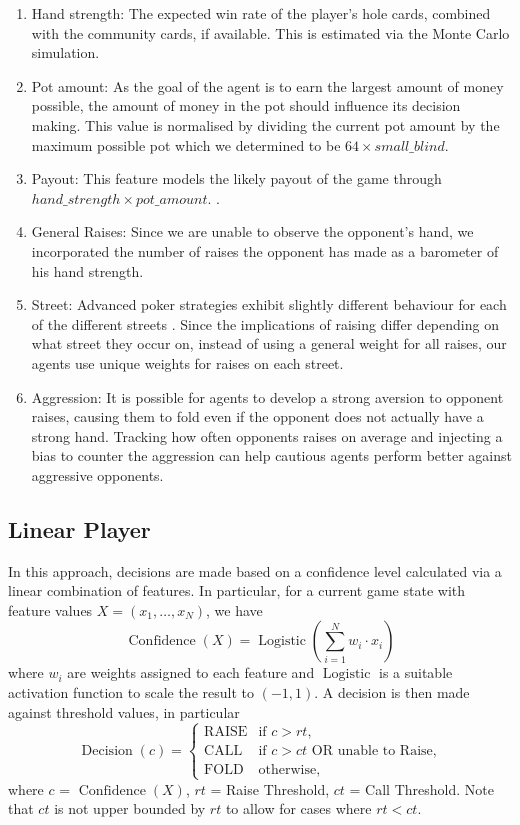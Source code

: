 \documentclass{article}
\begin{document}
\begin{enumerate}
\item Hand strength: The expected win rate of the player's hole cards, combined with the community cards, if available. This is estimated via the Monte Carlo simulation.

\item Pot amount: As the goal of the agent is to earn the largest amount of money possible, the amount of money in the pot should influence its decision making. This value is normalised by dividing the current pot amount by the maximum possible pot which we determined to be \(64\times small\_blind\).

\item Payout: This feature models the likely payout of the game through \(hand\_strength \times pot\_amount\). \cite{Billings:1998:OMP:295240.295723}.

\item General Raises: Since we are unable to observe the opponent's hand, we incorporated the number of raises the opponent has made as a barometer of his hand strength.

\item Street: Advanced poker strategies exhibit slightly different behaviour for each of the different streets \cite{liley2010probability}. Since the implications of raising differ depending on what street they occur on,  instead of using a general weight for all raises, our agents use unique weights for raises on each street.

\item Aggression: It is possible for agents to develop a strong aversion to opponent raises, causing them to fold even if the opponent does not actually have a strong hand. Tracking how often opponents raises on average and injecting a bias to counter the aggression can help cautious agents perform better against aggressive opponents.
\end{enumerate}

\subsection{Linear Player}
In this approach, decisions are made based on a confidence level calculated via a linear combination of features. In particular, for a current game state with feature values \(X = (x_1, \dots, x_N)\), we have \[\operatorname{Confidence}(X) = \operatorname{Logistic}\left(\sum_{i = 1}^{N} w_i \cdot x_i \right)\] where \(w_i\) are weights assigned to each feature and \(\operatorname{Logistic}\) is a suitable activation function to scale the result to \((-1, 1)\). A decision is then made against threshold values, in particular \[\operatorname{Decision}(c) = \begin{cases} \operatorname{RAISE} & \text{if } c >\text{$rt$,}\\\operatorname{CALL} & \text{if }c > \text{$ct$ OR unable to Raise,} \\\operatorname{FOLD} &\text{otherwise,}\end{cases}\] where \(c\) = \(\operatorname{Confidence}(X)\), \(rt\) = Raise Threshold, \(ct\) = Call Threshold. Note that \(ct\) is not upper bounded by \(rt\) to allow for cases where \(rt < ct\).
\end{document}
